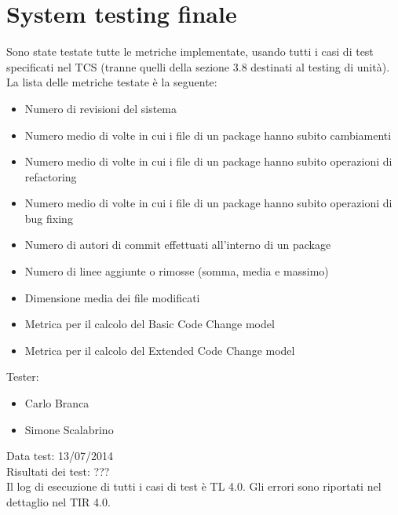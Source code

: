 \section{System testing finale}
Sono state testate tutte le metriche implementate, usando tutti i casi di test specificati nel TCS (tranne quelli della sezione 3.8 destinati al testing di unità). La lista delle metriche testate è la seguente:
\begin{itemize}
 \item Numero di revisioni del sistema
 \item Numero medio di volte in cui i file di un package hanno subito cambiamenti
 \item Numero medio di volte in cui i file di un package hanno subito operazioni di refactoring
 \item Numero medio di volte in cui i file di un package hanno subito operazioni di bug fixing
 \item Numero di autori di commit effettuati all’interno di un package
 \item Numero di linee aggiunte o rimosse (somma, media e massimo)
 \item Dimensione media dei file modificati
 \item Metrica per il calcolo del Basic Code Change model
 \item Metrica per il calcolo del Extended Code Change model
\end{itemize}
Tester:
\begin{itemize}
\item Carlo Branca
\item Simone Scalabrino
\end{itemize}
Data test: 13/07/2014\\
Risultati dei test: ???\\
Il log di esecuzione di tutti i casi di test è TL 4.0. Gli errori sono riportati nel dettaglio nel TIR 4.0.
